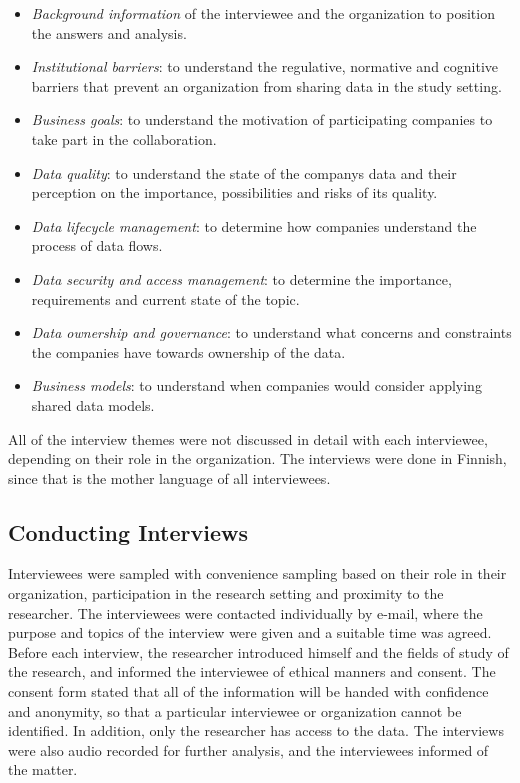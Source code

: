 \begin{itemize}  
\item \textit{Background information} of the interviewee and the organization to position the answers and analysis.
\item \textit{Institutional barriers}: to understand the regulative, normative and cognitive barriers that prevent an organization from sharing data in the study setting.
\item \textit{Business goals}: to understand the motivation of participating companies to take part in the collaboration. 
\item \textit{Data quality}: to understand the state of the companys data and their perception on the importance, possibilities and risks of its quality. 
\item \textit{Data lifecycle management}: to determine how companies understand the process of data flows.
\item \textit{Data security and access management}: to determine the importance, requirements and current state of the topic. 
\item \textit{Data ownership and governance}: to understand what concerns and constraints the companies have towards ownership of the data.
\item \textit{Business models}: to understand when companies would consider applying shared data models.
\end{itemize}

All of the interview themes were not discussed in detail with each interviewee, depending on their role in the organization. The interviews were done in Finnish, since that is the mother language of all interviewees. 

\subsection{Conducting Interviews}
Interviewees were sampled with convenience sampling based on their role in their organization, participation in the research setting and proximity to the researcher. The interviewees were contacted individually by e-mail, where the purpose and topics of the interview were given and a suitable time was agreed. Before each interview, the researcher introduced himself and the fields of study of the research, and informed the interviewee of ethical manners and consent. The consent form stated that all of the information will be handed with confidence and anonymity, so that a particular interviewee or organization cannot be identified. In addition, only the researcher has access to the data. The interviews were also audio recorded for further analysis, and the interviewees informed of the matter.

